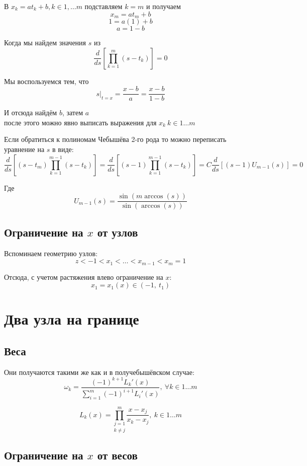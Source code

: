 \documentclass[12pt,a4paper]{article}
\begin{document}
	\noindent В $x_k = a t_{k} + b, k \in 1, \ldots m$ подставляем $k=m$ и получаем
	\[
	x_m = a t_m + b
	\]
	\[
	1 = a (1) + b
	\]
	\[
	a = 1 - b
	\]
	
	\noindent Когда мы найдем значения $s$ из
	\[
	\frac{d}{ds} \left[\prod_{k=1}^{m} \left( s - t_{k} \right) \right] = 0
	\]
	
	\noindent Мы воспользуемся тем, что
	\[
	s |_{t=x} = \frac{x-b}{a} = \frac{x-b}{1 - b}
	\]
	
	\noindent И отсюда найдём $b$, затем $a$ \\
	после этого можно явно выписать выражения для $x_k \  k \in 1 \ldots m$
	
	
	\noindent Если обратиться к полиномам Чебышёва 2-го рода то можно переписать уравнение на $s$ в виде:
	\[
	\frac{d}{ds} \left[ (s-t_m) \prod_{k=1}^{m-1} \left( s - t_{k} \right) \right] = 
	\frac{d}{ds} \left[ (s-1) \prod_{k=1}^{m-1} \left( s - t_{k} \right) \right] = 
	C \frac{d}{ds} \left[ (s-1) U_{m-1}(s) \right] = 0
	\]
	
	\noindent Где
	\[
	U_{m-1}(s) = \frac{\sin(m \arccos(s))}{\sin(\arccos(s))}
	\]
	
	
	\subsection{Ограничение на $x$ от узлов}
	
	\noindent Вспоминаем геометрию узлов:
	\[
	z < -1 < x_1 < \ldots < x_{m-1} < x_m = 1
	\]
	
	\noindent Отсюда, с учетом растяжения влево ограничение на $x$:
	\[
	x_1 = x_1(x) \in (-1, \ t_1)
	\]
	
	
	\newpage
	\section{Два узла на границе}
	
	\subsection{Веса}
	
	\noindent Они получаются такими же как и в получебышёвском случае:
	\[
	\omega_k  = 
	\frac
	{
		(-1)^{k+1} L_k'(x)
	}
	{
		\sum_{i=1}^{m} (-1)^{i+1}  L_i'(x)
	}, \ \forall k \in 1 \ldots m 
	\]
	
	\[
	L_k(x) = \underset{k \neq j}{\prod_{j=1}^{m}} \frac{x - x_j}{x_k - x_j}, \ k \in 1 \ldots m
	\]
	
	\subsection{Ограничение на $x$ от весов}
	
\end{document}
